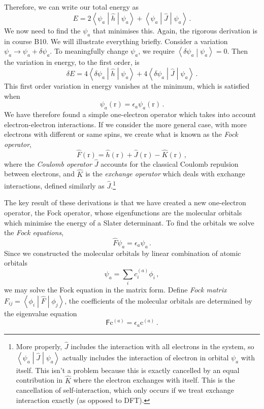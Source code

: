 \documentclass{article}
\theoremstyle{plain}\theoremheaderfont{\normalfont\itshape}\theorembodyfont{\rmfamily}\theoremseparator{.}\newtheorem*{rem}{Remark}\newtheorem*{ex}{Example}\newtheorem*{proof}{Proof}\newtheorem*{altp}{Alternative proof}
\theoremstyle{plain}\theoremheaderfont{\normalfont\bfseries}\theorembodyfont{\rmfamily}\theoremseparator{.}\newtheorem{thm}{Theorem}[section]\newtheorem{lem}[thm]{Lemma}\newtheorem{prop}[thm]{Proposition}\newtheorem*{cor}{Corollary}\newtheorem{defn}[thm]{Definition}\newtheorem{clm}[thm]{Claim}\newtheorem{clminproof}{Claim}\newtheorem{pos}{Postulate}[section]
\theoremstyle{break}\theoremheaderfont{\normalfont\itshape}\theorembodyfont{\rmfamily}\theoremseparator{.\medskip}\newtheorem*{proofskip}{Proof}\newtheorem*{exs}{Examples}\newtheorem*{rems}{Remarks}
\theoremstyle{break}\theoremheaderfont{\normalfont\bfseries}\theorembodyfont{\rmfamily}\theoremseparator{.\medskip}\newtheorem{lemskip}[thm]{Lemma}\newtheorem{defnskip}[thm]{Definition}\newtheorem{propskip}[thm]{Proposition}\newtheorem{thmskip}[thm]{Theorem}
\numberwithin{equation}{section}
\newcommand{\braket}[2]{\left\langle #1 \middle| #2 \right\rangle}
\newcommand{\expval}[2]{\left\langle #2 \middle| #1 \middle| #2 \right\rangle}
\newcommand{\mel}[3]{\left\langle #1 \middle| #2 \middle| #3 \right\rangle}
\newcommand{\vb}[1]{\bm{\mathrm{#1}}}
\begin{document}
    Therefore, we can write our total energy as
    \begin{equation}
        E=2\expval{\hat{h}}{\psi_a}+\expval{\hat{J}}{\psi_a}\,.
    \end{equation}
    We now need to find the \(\psi_a\) that minimises this. Again, the rigorous derivation is in course B10. We will illustrate everything briefly. Consider a variation \(\psi_a\to\psi_a+\delta\psi_a\). To meaningfully change \(\psi_a\), we require \(\braket{\delta\psi_a}{\psi_a}=0\). Then the variation in energy, to the first order, is
    \begin{equation}
        \delta E=4\mel{\delta\psi_a}{\hat{h}}{\psi_a}+4\mel{\delta\psi_a}{\hat{J}}{\psi_a}\,.
    \end{equation}
    This first order variation in energy vanishes at the minimum, which is satisfied when
    \begin{equation}
        [\hat{h}(\vb{r})+\hat{J}(\vb{r})]\psi_a(\vb{r})=\epsilon_a\psi_a(\vb{r})\,.
    \end{equation}
    We have therefore found a simple one-electron operator which takes into account electron-electron interactions. If we consider the more general case, with more electrons with different or same spins, we create what is known as the \textit{Fock operator},
    \begin{equation}
        \hat{F}(\vb{r})=\hat{h}(\vb{r})+\hat{J}(\vb{r})-\hat{K}(\vb{r})\,,
    \end{equation}
    where the \textit{Coulomb operator} \(\hat{J}\) accounts for the classical Coulomb repulsion between electrons, and \(\hat{K}\) is the \textit{exchange operator} which deals with exchange interactions, defined similarly as \(\hat{J}\).\footnote{More properly, \(\hat{J}\) includes the interaction with all electrons in the system, so \(\expval{\hat{J}}{\psi_a}\) actually includes the interaction of electron in orbital \(\psi_a\) with itself. This isn't a problem because this is exactly cancelled by an equal contribution in \(\hat{K}\) where the electron exchanges with itself. This is the cancellation of self-interaction, which only occurs if we treat exchange interaction exactly (as opposed to DFT).}

    The key result of these derivations is that we have created a new one-electron operator, the Fock operator, whose eigenfunctions are the molecular orbitals which minimise the energy of a Slater determinant. To find the orbitals we solve the \textit{Fock equations},
    \begin{equation}
        \hat{F}\psi_a=\epsilon_a\psi_a\,.
    \end{equation}
    Since we constructed the molecular orbitals by linear combination of atomic orbitals
    \begin{equation}
        \psi_a=\sum_i c_i^{(a)}\phi_i\,,
    \end{equation}
    we may solve the Fock equation in the matrix form. Define \textit{Fock matrix} \(F_{ij}=\mel{\phi_i}{\hat{F}}{\phi_j}\), the coefficients of the molecular orbitals are determined by the eigenvalue equation
    \begin{equation}
        \mathsf{F}\vb{c}^{(a)}=\epsilon_a\vb{c}^{(a)}\,.
    \end{equation}
\end{document}
